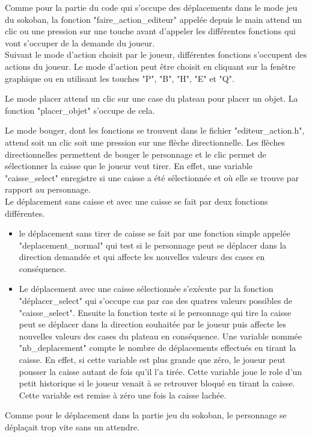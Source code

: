 \documentclass{report}
\begin{document}
Comme pour la partie du code qui s'occupe des déplacements dans le mode jeu du sokoban, la fonction "faire\_action\_editeur" appelée depuis le main attend un clic ou une pression sur une touche avant d'appeler les différentes fonctions qui vont s'occuper de la demande du joueur.\\
Suivant le mode d'action choisit par le joueur, différentes fonctions s'occupent des actions du joueur.
Le mode d'action peut être choisit en cliquant sur la fenêtre graphique ou en utilisant les touches "P", "B", "H", "E" et "Q".


Le mode placer attend un clic sur une case du plateau pour placer un objet. La fonction "placer\_objet" s'occupe de cela.


Le mode bouger, dont les fonctions se trouvent dans le fichier "editeur\_action.h", attend soit un clic soit une pression sur une flèche directionnelle.
Les flèches directionnelles permettent de bouger le personnage et le clic permet de sélectionner la caisse que le joueur veut tirer.
En effet, une variable "caisse\_select" enregistre si une caisse a été sélectionnée et où elle se trouve par rapport au personnage.\\
Le déplacement sans caisse et avec une caisse se fait par deux fonctions différentes.
\begin{itemize}
\item le déplacement sans tirer de caisse se fait par une fonction simple appelée "deplacement\_normal" qui test si le personnage peut se déplacer dans la direction demandée et qui affecte les nouvelles valeurs des cases en conséquence.
\item Le déplacement avec une caisse sélectionnée s'exécute par la fonction "déplacer\_select" qui s'occupe cas par cas des quatres valeurs possibles de "caisse\_select". 
Ensuite la fonction teste si le personnage qui tire la caisse peut se déplacer dans la direction souhaitée par le joueur puis affecte les nouvelles valeurs des cases du plateau en conséquence.
Une variable nommée "nb\_deplacement" compte le nombre de déplacements effectués en tirant la caisse. En effet, si cette variable est plus grande que zéro, le joueur peut pousser la caisse autant de fois qu'il l'a tirée.
Cette variable joue le role d'un petit historique si le joueur venait à se retrouver bloqué en tirant la caisse. Cette variable est remise à zéro une fois la caisse lachée.
\end{itemize}
Comme pour le déplacement dans la partie jeu du sokoban, le personnage se déplaçait trop vite sans un attendre.\\
\end{document}
